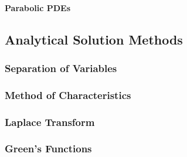 \paragraph{Parabolic PDEs}





\subsection{Analytical Solution Methods}



\subsubsection{Separation of Variables}




\subsubsection{Method of Characteristics}

\subsubsection{Laplace Transform}

\subsubsection{Green's Functions}




